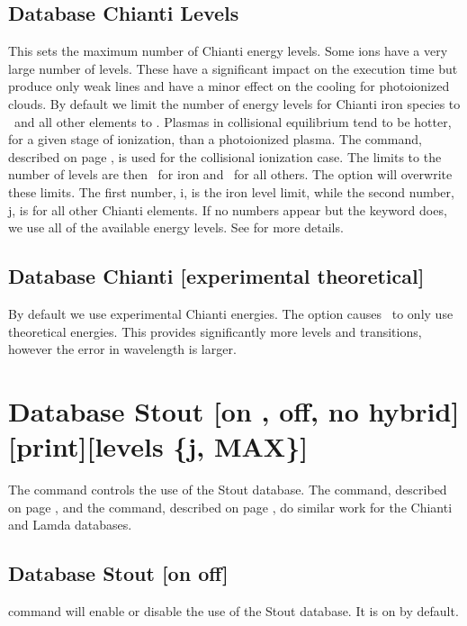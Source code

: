 \subsection{Database Chianti Levels} 
\label{sec:AtomChiantiLevels}
This sets the maximum number of Chianti energy levels. 
Some ions have a very large number of levels.
These have a significant impact
on the execution time but produce only weak lines and have a minor effect
on the cooling for photoionized clouds.
By default we limit the number of energy levels for Chianti iron species to 
\nDefaultPhotoLevelsFe\ and all other elements to \nDefaultPhotoLevels.
Plasmas in collisional equilibrium tend to be hotter, for a given
stage of ionization, than a photoionized plasma.  
The  command, described on
page \pageref{sec:CommandCoronalEquilibrium}, is used for
the collisional ionization case.
The limits to the number of levels are then \nDefaultCollLevelsFe\ for iron 
and \nDefaultCollLevels\ for all others.
The  option will overwrite these limits.
The first number, i, is the iron level limit, while the second number, 
j, is for all other Chianti elements.
If no numbers appear but the keyword  does, we use all 
of the available energy levels.
See \citet{2013MNRAS.429.3133L} for more details.

\subsection{Database Chianti [experimental theoretical]}
\label{sec:AtomChiantiExperimental}
By default we use experimental Chianti energies.
The  option causes \Cloudy\ to only use theoretical 
energies.
This provides significantly more levels and transitions, 
however the error in wavelength is larger.

\section{Database Stout [on , off, no hybrid][print][levels \{j, MAX\}]}
\label{sec:SetStout}
The command controls the use of the Stout database.
The  command, described on page \pageref{sec:SetChianti},
and the  command, described on page \pageref{sec:SetLamda},
do similar work for the Chianti and Lamda databases.

\subsection{Database Stout [on off]} 
command will enable or disable the use of the Stout database.
It is on by default.

